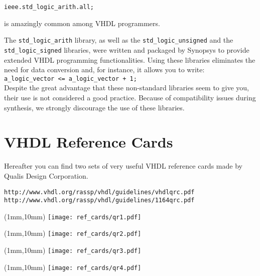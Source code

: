 \noindent
\texttt{ieee.std\_logic\_arith.all;}

\noindent
is amazingly common among VHDL programmers.

The \texttt{std\_logic\_arith} library, as well as the \texttt{std\_logic\_unsigned} and the \texttt{std\_logic\_signed} libraries, were written and packaged by Synopsys to provide extended VHDL programming functionalities. Using these libraries eliminates the need for data conversion and, for instance, it allows you to write:\\
\texttt{a\_logic\_vector <= a\_logic\_vector + 1;}\\
Despite the great advantage that these non-standard libraries seem to give you, their use is not considered a good practice. Because of compatibility issues during synthesis, we strongly discourage the use of these libraries.

\chapter{VHDL Reference Cards}
Hereafter you can find two sets of very useful VHDL reference cards made by Qualis Design Corporation.

\noindent
\begin{verbatim}
http://www.vhdl.org/rassp/vhdl/guidelines/vhdlqrc.pdf
http://www.vhdl.org/rassp/vhdl/guidelines/1164qrc.pdf
\end{verbatim}

\newpage\clearpage
\thispagestyle{empty}
\begin{textblock*}{148mm}(1mm,10mm)
\texttt{[image: ref\_cards/qr1.pdf]}
\end{textblock*}
\null\newpage

\thispagestyle{empty}
\begin{textblock*}{148mm}(1mm,10mm)
\texttt{[image: ref\_cards/qr2.pdf]}
\end{textblock*}
\null\newpage

\thispagestyle{empty}
\begin{textblock*}{148mm}(1mm,10mm)
\texttt{[image: ref\_cards/qr3.pdf]}
\end{textblock*}
\null\newpage

\thispagestyle{empty}
\begin{textblock*}{148mm}(1mm,10mm)
\texttt{[image: ref\_cards/qr4.pdf]}
\end{textblock*}
\null\newpage

